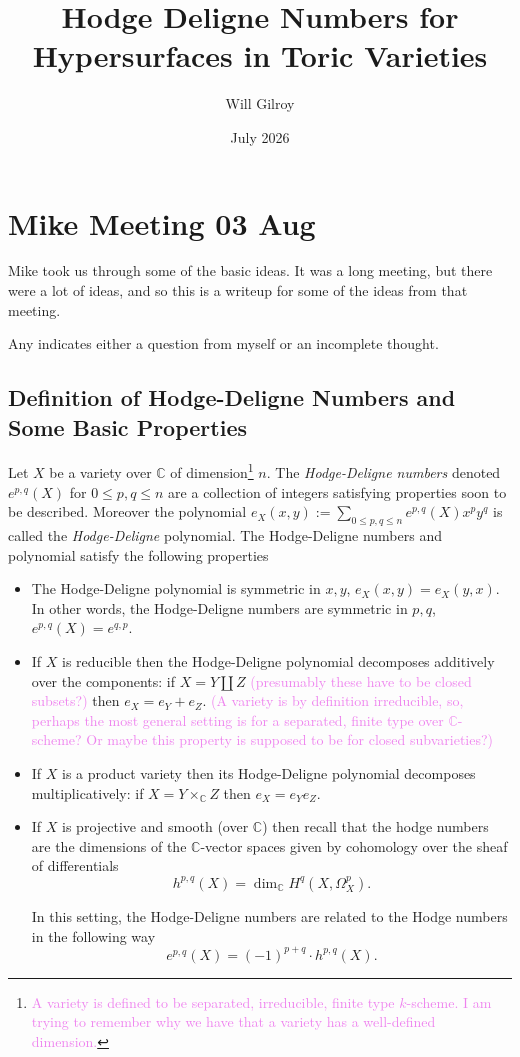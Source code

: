 \documentclass{article}
\title{
    Hodge Deligne Numbers for Hypersurfaces in Toric Varieties
}
\author{Will Gilroy}
\date{July 2026}
\theoremstyle{definition}
\theoremstyle{remark}
\newcommand{\wg}[1]{\textcolor{violet}{#1}}
\newcommand{\C}{\mathbb C}
\newcommand{\epq}{e^{p,q}}
\begin{document}
\maketitle

\section{Mike Meeting 03 Aug}
Mike took us through some of the basic ideas. It was a long meeting,
but there were a lot of ideas, and so this is a writeup for some of
the ideas from that meeting.

Any  indicates either a question from myself or
an incomplete thought. 

\subsection{Definition of Hodge-Deligne Numbers and Some Basic Properties}
Let $X$ be a variety over $\C$ of dimension\footnote{
    \wg{A variety is defined to be separated, irreducible, finite type
    $k$-scheme. I am trying to remember why we have that a variety has
    a well-defined dimension.}
}
 $n$.
The \textit{Hodge-Deligne numbers} denoted $e^{p,q}(X)$ for $0 \leq
p,q \leq n$ are a collection of integers satisfying properties soon to
be described. Moreover the polynomial $e_X(x,y) := \sum_{0 \leq p,q \leq n}
\epq(X) x^p y^q$ is called the \textit{Hodge-Deligne} polynomial.
The Hodge-Deligne numbers and polynomial satisfy the following
properties
\begin{itemize}
    \item The Hodge-Deligne polynomial is symmetric in $x,y$, $e_X(x,y) =
    e_X(y,x)$. In other words, the Hodge-Deligne numbers are symmetric
    in $p,q$, $e^{p,q}(X) = e^{q,p}$.
    
    \item If $X$ is reducible then the Hodge-Deligne polynomial
    decomposes additively over the components: if $X = Y \amalg Z$
    \wg{(presumably these have to be closed subsets?)} then $e_X = e_Y
    + e_Z$. 
    \wg{(A variety is by definition irreducible, so, perhaps the most
    general setting is for a separated, finite type over $\C$-scheme?
    Or maybe this property is supposed to be for closed subvarieties?)}

    \item If $X$ is a product variety then its Hodge-Deligne
    polynomial decomposes multiplicatively: if $X = Y \times_{\C} Z$
    then $e_X = e_Y e_Z$. 

    \item If $X$ is projective and smooth (over $\C$) then recall
    that the hodge numbers are the dimensions of the
    $\C$-vector spaces given by cohomology over the sheaf of
    differentials 
    \[
        h^{p,q}(X) = \dim_\C H^q(X, \Omega^p_X).
    \]

    In this setting, 
    the Hodge-Deligne numbers are related to the Hodge numbers in the
    following way
    \[
        \epq(X) = (-1)^{p+q} \cdot h^{p,q}(X). 
    \]
\end{itemize}
\end{document}
